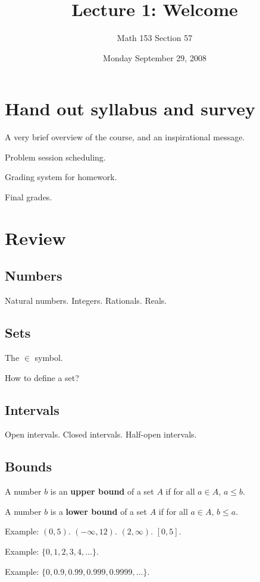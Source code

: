 \documentclass[12pt]{article}
\title{Lecture 1: Welcome}
\author{Math 153 Section 57}
\date{Monday September 29, 2008}
\begin{document}
\maketitle

\section{Hand out syllabus and survey}

A very brief overview of the course, and an inspirational message.

Problem session scheduling.

Grading system for homework.

Final grades.

\section{Review}

\subsection{Numbers}

Natural numbers. Integers. Rationals. Reals.

\subsection{Sets}

The $\in$ symbol.

How to define a set?

\subsection{Intervals}

Open intervals.  Closed intervals.  Half-open intervals.

\subsection{Bounds}

A number $b$ is an \textbf{upper bound} of a set $A$ if for all $a \in A$,
$a \leq b$.

A number $b$ is a \textbf{lower bound} of a set $A$ if for all $a \in A$,
$b \leq a$.

Example: $(0,5)$.  $(-\infty,12)$.  $(2,\infty)$.  $[0,5]$.

Example: $\{0, 1, 2, 3, 4, \ldots \}$.

Example: $\{0, 0.9, 0.99, 0.999, 0.9999, \ldots\}$.
\end{document}
